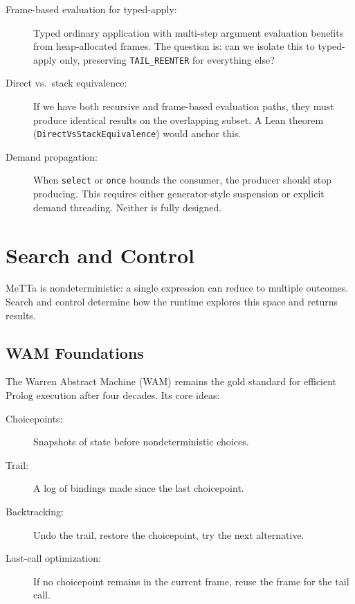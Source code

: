 \documentclass[11pt]{article}
\newcommand{\code}[1]{\texttt{#1}}
\newcommand{\WAM}{\textup{WAM}}
\begin{document}
\begin{description}
\item[Frame-based evaluation for typed-apply:]
  Typed ordinary application with multi-step argument evaluation benefits
  from heap-allocated frames.  The question is: can we isolate this to
  typed-apply only, preserving \code{TAIL\_REENTER} for everything else?
\item[Direct vs.\ stack equivalence:]
  If we have both recursive and frame-based evaluation paths, they must
  produce identical results on the overlapping subset.  A Lean theorem
  (\code{DirectVsStackEquivalence}) would anchor this.
\item[Demand propagation:]
  When \code{select} or \code{once} bounds the consumer, the producer
  should stop producing.  This requires either generator-style
  suspension or explicit demand threading.  Neither is fully designed.
\end{description}

\section{Search and Control}
\label{sec:search}

MeTTa is nondeterministic: a single expression can reduce to multiple
outcomes.  Search and control determine how the runtime explores this
space and returns results.

\subsection{WAM Foundations}

The Warren Abstract Machine (\WAM{}) remains the gold standard for
efficient Prolog execution after four decades.  Its core ideas:

\begin{description}
\item[Choicepoints:] Snapshots of state before nondeterministic choices.
\item[Trail:] A log of bindings made since the last choicepoint.
\item[Backtracking:] Undo the trail, restore the choicepoint, try the
  next alternative.
\item[Last-call optimization:] If no choicepoint remains in the current
  frame, reuse the frame for the tail call.
\end{description}
\end{document}
